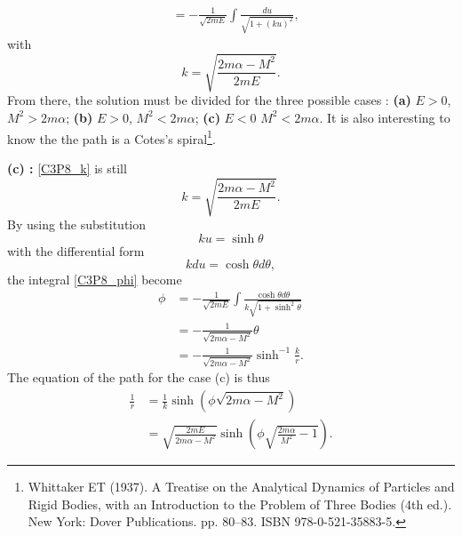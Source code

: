 \begin{problem}
{\begin{align}
    &= -\frac{1}{\sqrt{2mE}} \int \frac{du}{\sqrt{1 + (ku)^2}}, \label{C3P8_phi}
\end{align}
with
\begin{equation} \label{C3P8_k}
    k = \sqrt{\frac{2m\alpha-M^2}{2mE}}.
\end{equation}
From there, the solution must be divided for the three possible cases : \textbf{(a)} $E>0$, $M^2>2m\alpha$; \textbf{(b)} $E>0$, $M^2<2m\alpha$;  \textbf{(c)} $E<0$ $M^2<2m\alpha$. It is also interesting to know the the path is a Cotes's spiral\footnote{Whittaker ET (1937). A Treatise on the Analytical Dynamics of Particles and Rigid Bodies, with an Introduction to the Problem of Three Bodies (4th ed.). New York: Dover Publications. pp. 80–83. ISBN 978-0-521-35883-5.}.

\vspace{4ex}\textbf{(c) :} \eqref{C3P8_k} is still
\begin{equation*}
    k = \sqrt{\frac{2m\alpha-M^2}{2mE}}.
\end{equation*}
By using the substitution
\begin{equation*}
    ku = \sinh{\theta}
\end{equation*}
with the differential form
\begin{equation*}
    kdu = \cosh{\theta}d\theta,
\end{equation*}
the integral \eqref{C3P8_phi} become
\begin{align*}
    \phi &= -\frac{1}{\sqrt{2mE}} \int \frac{\cosh{\theta}d\theta}{k\sqrt{1 + \sinh^2{\theta}}} \\
    &= -\frac{1}{\sqrt{2m\alpha-M^2}} \theta \\
    &= -\frac{1}{\sqrt{2m\alpha-M^2}} \sinh^{-1}{\frac{k}{r}}.
\end{align*}
The equation of the path for the case (c) is thus
\begin{align*}
    \frac{1}{r} &= \frac{1}{k}\sinh{\left(\phi\sqrt{2m\alpha-M^2}\right)} \\
    &= \sqrt{\frac{2mE}{2m\alpha-M^2}}\sinh{\left(\phi\sqrt{\frac{2m\alpha}{M^2}-1}\right)}.
\end{align*}

}
\end{problem}
